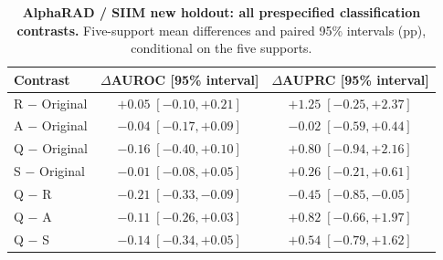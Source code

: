 \begin{table}[tp]
\centering
\caption{\textbf{AlphaRAD / SIIM new holdout: all prespecified classification contrasts.} Five-support mean differences and paired 95\% intervals (pp), conditional on the five supports.}
\label{tab:supp-path-ci-siim_new_holdout}
\footnotesize
\setlength{\tabcolsep}{4pt}
\begin{tabular*}{\textwidth}{@{\extracolsep{\fill}}lcc@{}}
\toprule
Contrast & $\Delta$AUROC [95\% interval] & $\Delta$AUPRC [95\% interval] \\
\midrule
R $-$ Original & $+0.05\;[-0.10,+0.21]$ & $+1.25\;[-0.25,+2.37]$ \\
A $-$ Original & $-0.04\;[-0.17,+0.09]$ & $-0.02\;[-0.59,+0.44]$ \\
Q $-$ Original & $-0.16\;[-0.40,+0.10]$ & $+0.80\;[-0.94,+2.16]$ \\
S $-$ Original & $-0.01\;[-0.08,+0.05]$ & $+0.26\;[-0.21,+0.61]$ \\
Q $-$ R & $-0.21\;[-0.33,-0.09]$ & $-0.45\;[-0.85,-0.05]$ \\
Q $-$ A & $-0.11\;[-0.26,+0.03]$ & $+0.82\;[-0.66,+1.97]$ \\
Q $-$ S & $-0.14\;[-0.34,+0.05]$ & $+0.54\;[-0.79,+1.62]$ \\
\bottomrule
\end{tabular*}
\end{table}
